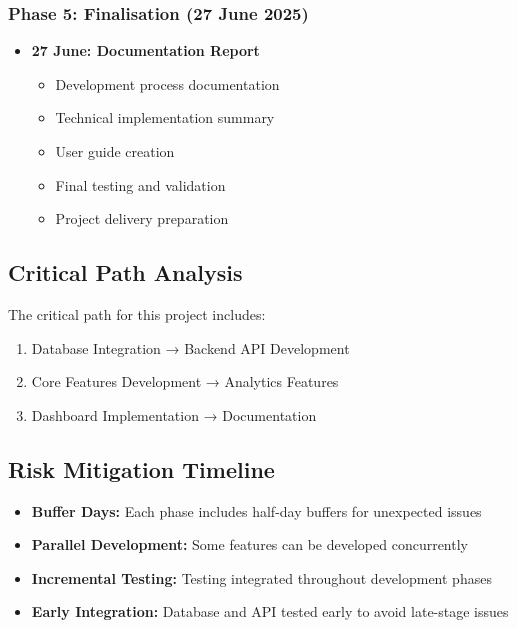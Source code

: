 \documentclass[11pt,a4paper]{article}
\begin{document}
\subsubsection{Phase 5: Finalisation (27 June 2025)}
\begin{itemize}
    \item \textbf{27 June: Documentation Report}
    \begin{itemize}
        \item Development process documentation
        \item Technical implementation summary
        \item User guide creation
        \item Final testing and validation
        \item Project delivery preparation
    \end{itemize}
\end{itemize}

\subsection{Critical Path Analysis}
The critical path for this project includes:
\begin{enumerate}
    \item Database Integration → Backend API Development
    \item Core Features Development → Analytics Features
    \item Dashboard Implementation → Documentation
\end{enumerate}

\subsection{Risk Mitigation Timeline}
\begin{itemize}
    \item \textbf{Buffer Days:} Each phase includes half-day buffers for unexpected issues
    \item \textbf{Parallel Development:} Some features can be developed concurrently
    \item \textbf{Incremental Testing:} Testing integrated throughout development phases
    \item \textbf{Early Integration:} Database and API tested early to avoid late-stage issues
\end{itemize}
\end{document}
